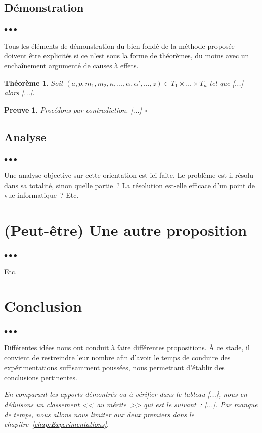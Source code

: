 \documentclass[11pt, french, screen, research-development]{report-rd-info}
\newenvironment{explanation}
{\color{blue}
 \begin{list}{}{\hspace{0.2\textwidth}\color{blue}}\item $\bullet\bullet\bullet$
}
{\end{list}}
\newtheorem{theoreme}{Théorème}
\newtheorem{preuve}{Preuve}
\begin{document}
\subsection{Démonstration}

\begin{explanation}
   Tous les éléments de démonstration du bien fondé de la méthode proposée doivent être explicités si ce n'est sous la forme de théorèmes, du moins avec un enchaînement argumenté de causes à effets.

   \begin{theoreme}
      Soit $(a, p, m_1, m_2, \kappa, \ldots, \alpha, \alpha', \ldots,z) \in T_1 \times \ldots \times T_n$ tel que [...] alors [...].
   \end{theoreme}

   \begin{preuve}
      Procédons par contradiction.
   [...]~\hfill$\square$
   \end{preuve}
\end{explanation}

\subsection{Analyse}

\begin{explanation}
   Une analyse objective sur cette orientation est ici faite.
   Le problème est-il résolu dans sa totalité, sinon quelle partie~?
   La résolution est-elle efficace d'un point de vue informatique~?
   Etc.
\end{explanation}

\section{(Peut-être) Une autre proposition}

\begin{explanation}
   Etc.
\end{explanation}

\section{Conclusion}

\begin{explanation}
   Différentes idées nous ont conduit à faire différentes propositions.
   À ce stade, il convient de restreindre leur nombre afin d'avoir le temps de conduire des expérimentations suffisamment poussées, nous permettant d'établir des conclusions pertinentes.

   \emph{En comparant les apports démontrés ou à vérifier dans le tableau [...], nous en déduisons un classement <<~au mérite~>> qui est le suivant~: [...].
   Par manque de temps, nous allons nous limiter aux deux premiers dans le chapitre~\ref{chap:Experimentations}.}
\end{explanation}
\end{document}
